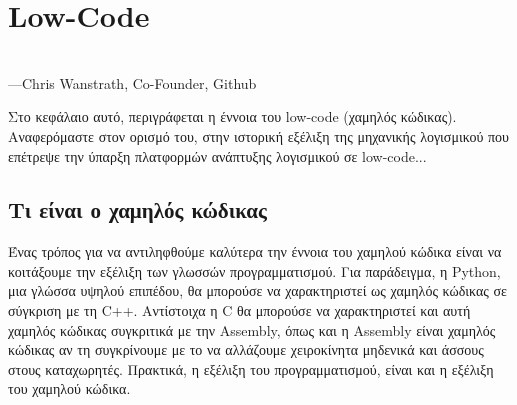 \chapter{Low-Code}
    \begin{displayquote} \centering
         \\
        \hspace*{\fill}---Chris Wanstrath, Co-Founder, Github
    \end{displayquote}
    \vspace{1em}

    Στο κεφάλαιο αυτό, περιγράφεται η έννοια του low-code (χαμηλός κώδικας). Αναφερόμαστε στον ορισμό του, στην ιστορική εξέλιξη της μηχανικής λογισμικού που επέτρεψε την ύπαρξη πλατφορμών ανάπτυξης λογισμικού σε low-code...


    \section{Τι είναι ο χαμηλός κώδικας}
        \begin{displayquote} \justifying
             \cite{Ibm_2024}
        \end{displayquote}

        Ένας τρόπος για να αντιληφθούμε καλύτερα την έννοια του χαμηλού κώδικα είναι να κοιτάξουμε την εξέλιξη των γλωσσών προγραμματισμού. Για παράδειγμα, η Python, μια γλώσσα υψηλού επιπέδου, θα μπορούσε να χαρακτηριστεί ως χαμηλός κώδικας σε σύγκριση με τη C++. Αντίστοιχα η C θα μπορούσε να χαρακτηριστεί και αυτή χαμηλός κώδικας συγκριτικά με την Assembly, όπως και η Assembly είναι χαμηλός κώδικας αν τη συγκρίνουμε με το να αλλάζουμε χειροκίνητα μηδενικά και άσσους στους καταχωρητές. Πρακτικά, η εξέλιξη του προγραμματισμού, είναι και η εξέλιξη του χαμηλού κώδικα.

